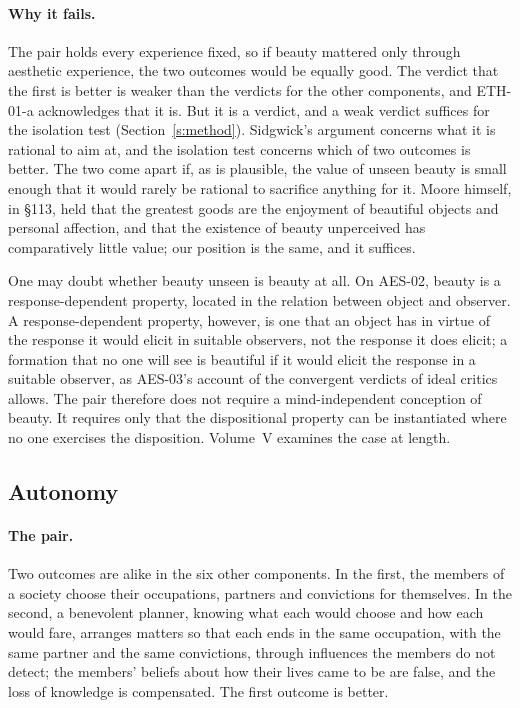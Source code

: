 \documentclass{situationist-preprint}
\begin{document}
\paragraph{Why it fails.} The pair holds every experience fixed, so if beauty mattered only through aesthetic experience, the two outcomes would be equally good. The verdict that the first is better is weaker than the verdicts for the other components, and ETH-01-a acknowledges that it is. But it is a verdict, and a weak verdict suffices for the isolation test (Section~\ref{s:method}). Sidgwick's argument concerns what it is rational to aim at, and the isolation test concerns which of two outcomes is better. The two come apart if, as is plausible, the value of unseen beauty is small enough that it would rarely be rational to sacrifice anything for it. Moore himself, in \S113, held that the greatest goods are the enjoyment of beautiful objects and personal affection, and that the existence of beauty unperceived has comparatively little value; our position is the same, and it suffices.

One may doubt whether beauty unseen is beauty at all. On AES-02, beauty is a response-dependent property, located in the relation between object and observer. A response-dependent property, however, is one that an object has in virtue of the response it would elicit in suitable observers, not the response it does elicit; a formation that no one will see is beautiful if it would elicit the response in a suitable observer, as AES-03's account of the convergent verdicts of ideal critics allows. The pair therefore does not require a mind-independent conception of beauty. It requires only that the dispositional property can be instantiated where no one exercises the disposition. Volume~V examines the case at length.

\subsection{Autonomy}

\paragraph{The pair.} Two outcomes are alike in the six other components. In the first, the members of a society choose their occupations, partners and convictions for themselves. In the second, a benevolent planner, knowing what each would choose and how each would fare, arranges matters so that each ends in the same occupation, with the same partner and the same convictions, through influences the members do not detect; the members' beliefs about how their lives came to be are false, and the loss of knowledge is compensated. The first outcome is better.
\end{document}
